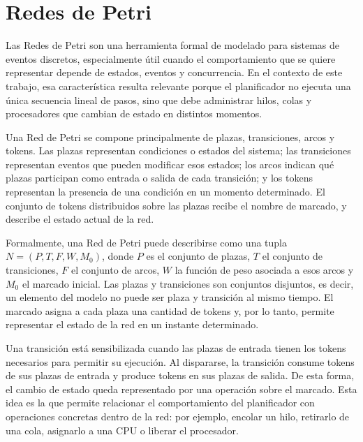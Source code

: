 \section{Redes de Petri}

Las Redes de Petri son una herramienta formal de modelado para sistemas de eventos discretos, especialmente útil cuando el comportamiento que se quiere representar depende de estados, eventos y concurrencia\cite{bib8,bib9}. En el contexto de este trabajo, esa característica resulta relevante porque el planificador no ejecuta una única secuencia lineal de pasos, sino que debe administrar hilos, colas y procesadores que cambian de estado en distintos momentos.\par

Una Red de Petri se compone principalmente de plazas, transiciones, arcos y tokens. Las plazas representan condiciones o estados del sistema; las transiciones representan eventos que pueden modificar esos estados; los arcos indican qué plazas participan como entrada o salida de cada transición; y los tokens representan la presencia de una condición en un momento determinado. El conjunto de tokens distribuidos sobre las plazas recibe el nombre de marcado, y describe el estado actual de la red\cite{bib7}.\par

Formalmente, una Red de Petri puede describirse como una tupla \(N = (P, T, F, W, M_0)\), donde \(P\) es el conjunto de plazas, \(T\) el conjunto de transiciones, \(F\) el conjunto de arcos, \(W\) la función de peso asociada a esos arcos y \(M_0\) el marcado inicial. Las plazas y transiciones son conjuntos disjuntos, es decir, un elemento del modelo no puede ser plaza y transición al mismo tiempo. El marcado asigna a cada plaza una cantidad de tokens y, por lo tanto, permite representar el estado de la red en un instante determinado\cite{bib7}.\par

Una transición está sensibilizada cuando las plazas de entrada tienen los tokens necesarios para permitir su ejecución. Al dispararse, la transición consume tokens de sus plazas de entrada y produce tokens en sus plazas de salida. De esta forma, el cambio de estado queda representado por una operación sobre el marcado. Esta idea es la que permite relacionar el comportamiento del planificador con operaciones concretas dentro de la red: por ejemplo, encolar un hilo, retirarlo de una cola, asignarlo a una CPU o liberar el procesador.\par

